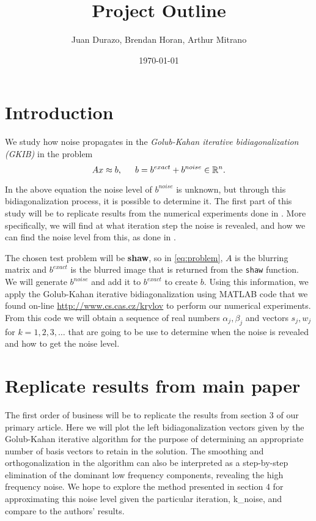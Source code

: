 \documentclass[11pt]{amsart}
\title{Project Outline}
\author{Juan Durazo, Brendan Horan, Arthur Mitrano}
\date{\today}  %
\begin{document}
\maketitle

\section{Introduction}
We study how noise propagates in the \emph{Golub-Kahan iterative bidiagonalization (GKIB)} in the
problem 
\begin{equation} \label{eq:problem}
	Ax\approx b, \indent  b=b^{exact} + b^{noise} \in \mathbb{R}^n.
\end{equation}

In the above equation the noise level of $b^{noise}$ is unknown, but through this bidiagonalization
process, it is possible to determine it. The first part of this study will be to replicate results
from the numerical experiments done in \cite{bidiagonalization}. More specifically, we will find
at what iteration step the noise is revealed, and how we can find the noise level from this, as
done in \cite{bidiagonalization}.

The chosen test problem will be {\bf shaw}, so in \eqref{eq:problem}, $A$ is the blurring matrix and
$b^{exact}$ is the blurred image that is returned from the \texttt{shaw} function. We will generate 
$b^{noise}$ and add it to $b^{exact}$ to create $b$. Using this information, we apply the Golub-Kahan
iterative bidiagonalization using MATLAB code that we found on-line \url{http://www.cs.cas.cz/krylov}
to perform our numerical experiments. From this code we will obtain a sequence of real numbers 
$\alpha_j,\beta_j$ and vectors $s_j,w_j$ for $k=1,2,3,\ldots$ that are going to be use to determine
when the noise is revealed and how to get the noise level.


\section{Replicate results from main paper}
The first order of business will be to replicate the results from section 3 of our primary article. Here we will plot the left bidiagonalization vectors given by the Golub-Kahan iterative algorithm for the purpose of determining an appropriate number of basis vectors to retain in the solution. The smoothing and orthogonalization in the algorithm can also be interpreted as a step-by-step elimination of the dominant low frequency components, revealing the high frequency noise. We hope to explore the method presented in section 4 for approximating this noise level given the particular iteration, k_noise, and compare to the authors' results.
\end{document}
